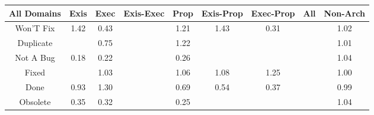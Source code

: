 \begin{tabular}{|c||c|c|c|c|c|c|c|c|}
\hline
All Domains & Exis & Exec & Exis-Exec & Prop & Exis-Prop & Exec-Prop & All & Non-Arch \\ 
\hline
Won'T Fix & \cellcolor[rgb]{0.9078827318762941,0.8389970835203499,0.42} 1.42 & \cellcolor[rgb]{0.8143702192947642,0.38735237132855005,0.3307455380084465} 0.43 &  & \cellcolor[rgb]{0.9089614085540856,0.8395080356308826,0.42} 1.21 & \cellcolor[rgb]{0.907868692446178,0.838990433263979,0.42} 1.43 & \cellcolor[rgb]{0.7938220797770232,0.2900911776112435,0.31156727445855503} 0.31 &  & \cellcolor[rgb]{0.909883306760058,0.8399447242547643,0.42} 1.02 \\ 
\hline
Duplicate &  & \cellcolor[rgb]{0.8683559658848068,0.6428849051880849,0.3811322348258196} 0.75 &  & \cellcolor[rgb]{0.9089019903218448,0.8394798901524527,0.42} 1.22 &  &  &  & \cellcolor[rgb]{0.9099467619792633,0.8399747819901773,0.42} 1.01 \\ 
\hline
Not A Bug & \cellcolor[rgb]{0.7720270564198433,0.1869280670539252,0.2912252526585205} 0.18 & \cellcolor[rgb]{0.7774402313082314,0.21255042819229536,0.296277549221016} 0.22 &  & \cellcolor[rgb]{0.7844761616312552,0.2458538317212749,0.3028444175225049} 0.26 &  &  &  & \cellcolor[rgb]{0.9097765802045545,0.8398941695705785,0.42} 1.04 \\ 
\hline
Fixed &  & \cellcolor[rgb]{0.9098261101577964,0.8399176311273773,0.42} 1.03 &  & \cellcolor[rgb]{0.9096789197265968,0.8398479093441774,0.42} 1.06 & \cellcolor[rgb]{0.9096138419160372,0.8398170830128596,0.42} 1.08 & \cellcolor[rgb]{0.9087358624849985,0.8394011980192098,0.42} 1.25 &  & \cellcolor[rgb]{0.9096833703690244,0.8385012864133817,0.41970447901108937} 1.00 \\ 
\hline
Done & \cellcolor[rgb]{0.8988235156752581,0.7870979741962214,0.40956861463024086} 0.93 & \cellcolor[rgb]{0.9084939070956384,0.8392865875716181,0.42} 1.30 &  & \cellcolor[rgb]{0.8580459882349682,0.5940843443121826,0.37150958901930364} 0.69 & \cellcolor[rgb]{0.8321963062117647,0.4717291827356858,0.34738321913098036} 0.54 & \cellcolor[rgb]{0.8033551493026371,0.33521437336581533,0.3204648060157946} 0.37 &  & \cellcolor[rgb]{0.9079129346980548,0.8301212242374592,0.4180520723848511} 0.99 \\ 
\hline
Obsolete & \cellcolor[rgb]{0.7997817361520134,0.3183002177861968,0.31712962040854586} 0.35 & \cellcolor[rgb]{0.7956802151260792,0.2988863515967748,0.3133015341176739} 0.32 &  & \cellcolor[rgb]{0.7827579567944307,0.2377209954936386,0.301240759674802} 0.25 &  &  &  & \cellcolor[rgb]{0.9098058742847868,0.8399080457138463,0.42} 1.04 \\ 

\end{tabular}
